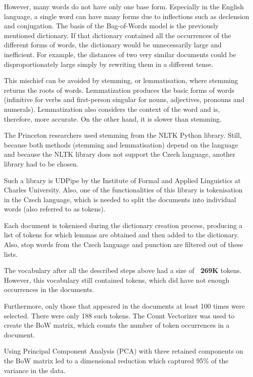         However, many words do not have only one base form. Especially in the English language, a single word can have many forms due to inflections such as declension and conjugation. The basis of the Bag-of-Words model is the previously mentioned dictionary. If that dictionary contained all the occurrences of the different forms of words, the dictionary would be unnecessarily large and inefficient. For example, the distances of two very similar documents could be disproportionately large simply by rewriting them in a different tense.

        This mischief can be avoided by stemming, or lemmatisation, where stemming returns the roots of words. Lemmatization produces the basic forms of words (infinitive for verbs and first-person singular for nouns, adjectives, pronouns and numerals). Lemmatization also considers the context of the word and is, therefore, more accurate\cite{stemming-and-lemmatisation}. On the other hand, it is slower than stemming.

        The Princeton researchers used stemming from the NLTK Python library\cite{nltk}. Still, because both methods (stemming and lemmatisation) depend on the language and because the NLTK library does not support the Czech language, another library had to be chosen.

        Such a library is UDPipe\cite{udpipe} by the Institute of Formal and Applied Linguistics at Charles University. Also, one of the functionalities of this library is tokenisation in the Czech language, which is needed to split the documents into individual words (also referred to as tokens)\cite{tokenisation}.

        Each document is tokenised during the dictionary creation process, producing a list of tokens for which lemmas are obtained and then added to the dictionary. Also, stop words from the Czech language and punction are filtered out of these lists.

        The vocabulary after all the described steps above had a size of \textbf{~269K} tokens. However, this vocabulary still contained tokens, which did have not enough occurrences in the documents.

        Furthermore, only those that appeared in the documents at least 100 times were selected. There were only 188 such tokens. The Count Vectorizer\cite{count-vectorizer} was used to create the BoW matrix, which counts the number of token occurrences in a document. 

        Using Principal Component Analysis (PCA) with three retained components on the BoW matrix led to a dimensional reduction which captured 95\% of the variance in the data.

